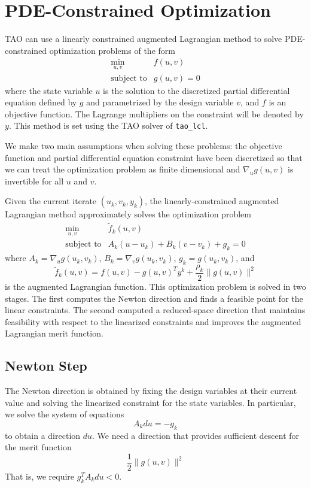 \section{PDE-Constrained Optimization}
\label{sec:lcl}

TAO can use a linearly constrained augmented Lagrangian method
to solve PDE-constrained optimization problems of the form
\[
\begin{array}{ll}
\displaystyle \min_{u,v} & f(u,v) \\
\mbox{subject to} & g(u,v) = 0
\end{array}
\]
where the state variable $u$ is the solution to the discretized
partial differential equation defined by $g$ and parametrized by 
the design variable $v$, and $f$ is an objective function.  The 
Lagrange multipliers on the constraint will be denoted by $y$.
This method is set using the TAO solver of {\tt tao\_lcl}.

We make two main assumptions when solving these problems: the 
objective function and partial differential equation constraint 
have been discretized so that we can treat the optimization problem 
as finite dimensional and $\nabla_u g(u,v)$ is invertible for all 
$u$ and $v$.

Given the current iterate $(u_k, v_k, y_k)$, the linearly-constrained
augmented Lagrangian method approximately solves the optimization 
problem
\[
\begin{array}{ll}
\displaystyle \min_{u,v} & \tilde{f}_k(u, v) \\
\mbox{subject to} & A_k (u-u_k) + B_k (v-v_k) + g_k = 0
\end{array}
\]
where $A_k = \nabla_u g(u_k,v_k)$, $B_k = \nabla_v g(u_k,v_k)$, 
$g_k = g(u_k, v_k)$, and 
\[
\tilde{f}_k(u,v) = f(u,v) - g(u,v)^T y^k + \frac{\rho_k}{2} \| g(u,v) \|^2
\]
is the augmented Lagrangian function.  This optimization problem is
solved in two stages.  The first computes the Newton direction and
finds a feasible point for the linear constraints.  The second 
computed a reduced-space direction that maintains feasibility
with respect to the linearized constraints and improves the
augmented Lagrangian merit function.

\subsection{Newton Step}

The Newton direction is obtained by fixing the design variables at
their current value and solving the linearized constraint for the
state variables.  In particular, we solve the system of equations
\[
A_k du = -g_k
\]
to obtain a direction $du$.  We need a direction that provides
sufficient descent for the merit function
\[
  \frac{1}{2} \|g(u,v)\|^2
\]
That is, we require $g_k^T A_k du < 0$.  

